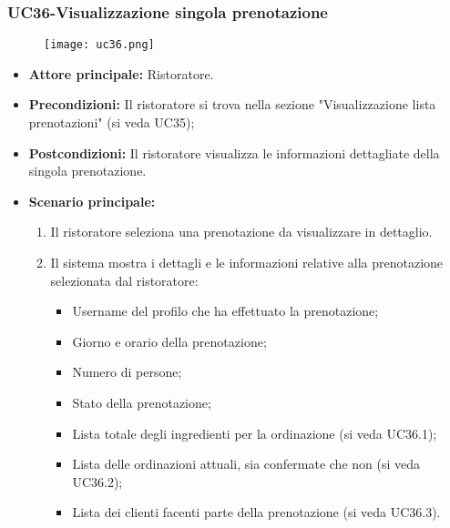 \subsubsection{UC36-Visualizzazione singola prenotazione}
\begin{figure}[h] \texttt{[image: uc36.png]} \end{figure}
\begin{itemize}
    \item \textbf{Attore principale:} Ristoratore.
    \item \textbf{Precondizioni:} Il ristoratore si trova nella sezione "Visualizzazione lista prenotazioni" (si veda UC35);
    \item \textbf{Postcondizioni:} Il ristoratore visualizza le informazioni dettagliate della singola prenotazione.
    \item \textbf{Scenario principale:}
    \begin{enumerate}
        \item Il ristoratore seleziona una prenotazione da visualizzare in dettaglio.
        \item Il sistema mostra i dettagli e le informazioni relative alla prenotazione selezionata dal ristoratore:
        \begin{itemize}
            \item Username del profilo che ha effettuato la prenotazione;
            \item Giorno e orario della prenotazione;
            \item Numero di persone;
            \item Stato della prenotazione;
            \item Lista totale degli ingredienti per la ordinazione (si veda UC36.1);
            \item Lista delle ordinazioni attuali, sia confermate che non (si veda UC36.2);
            \item Lista dei clienti facenti parte della prenotazione (si veda UC36.3).
        \end{itemize}
    \end{enumerate}
\end{itemize}

